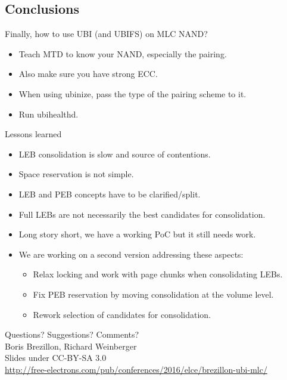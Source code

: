 \documentclass[aspectratio=169,obeyspaces,spaces,hyphens,dvipsnames]{beamer}
\begin{document}
\subsection{Conclusions}

\begin{frame}{Finally, how to use UBI (and UBIFS) on MLC NAND?}
  \begin{itemize}
  \item Teach MTD to know your NAND, especially the pairing.
  \item Also make sure you have strong ECC.
  \item When using ubinize, pass the type of the pairing scheme to it.
  \item Run ubihealthd.
  \end{itemize}
\end{frame}

\begin{frame}{Lessons learned}
  \begin{itemize}
  \item LEB consolidation is slow and source of contentions.
  \item Space reservation is not simple.
  \item LEB and PEB concepts have to be clarified/split.
  \item Full LEBs are not necessarily the best candidates for
	consolidation.
  \item Long story short, we have a working PoC but it still needs work.
  \item We are working on a second version addressing these aspects:
    \begin{itemize}
    \item Relax locking and work with page chunks when consolidating LEBs.
    \item Fix PEB reservation by moving consolidation at the volume level.
    \item Rework selection of candidates for consolidation.
    \end{itemize}
  \end{itemize}
\end{frame}

\begin{frame}
  \begin{center}
  \Huge
  Questions? Suggestions? Comments?\\
  \vspace{1.5cm}
  \huge
  Boris Brezillon, Richard Weinberger\\
  \large
  \vspace{0.5cm}
  \vspace{0.5cm}
  \newline Slides under CC-BY-SA 3.0\\
  \scriptsize
  \url{http://free-electrons.com/pub/conferences/2016/elce/brezillon-ubi-mlc/}
  \end{center}
\end{frame}
\end{document}
